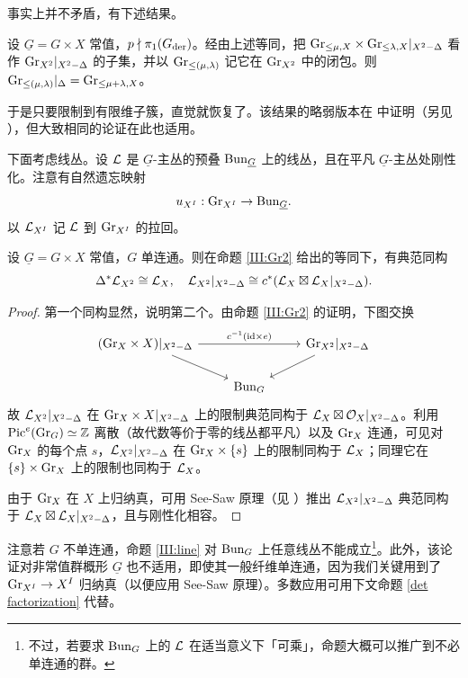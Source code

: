 事实上并不矛盾，有下述结果。

\begin{prop}\label{III:closure}
设 $\underline G=G\times X$ 常值，$p\nmid \pi_1(G_{\operatorname{der}})$。经由上述等同，把 ${\operatorname{Gr}}_{\leq \mu,X}\times {\operatorname{Gr}}_{\leq {\lambda},X}|_{X^2-\Delta}$ 看作 ${\operatorname{Gr}}_{X^2}|_{X^2-\Delta}$ 的子集，并以 ${\operatorname{Gr}}_{\leq (\mu,{\lambda})}$ 记它在 ${\operatorname{Gr}}_{X^2}$ 中的闭包。则 ${\operatorname{Gr}}_{\leq (\mu,{\lambda})}|_{\Delta}= {\operatorname{Gr}}_{\leq \mu+{\lambda},X}$。
\end{prop}

于是只要限制到有限维子簇，直觉就恢复了。该结果的略弱版本在 \cite{Z07} 中证明（另见 \cite{Z10}），但大致相同的论证在此也适用。

下面考虑线丛。设 ${\mathcal L}$ 是 $\underline G$-主丛的预叠 ${\operatorname{Bun}}_{\underline G}$ 上的线丛，且在平凡 $\underline G$-主丛处刚性化。注意有自然遗忘映射
\begin{equation}\label{III:I-un}
u_{X^I}: {\operatorname{Gr}}_{X^I}\to {\operatorname{Bun}}_{\underline G}.
\end{equation}
以 ${\mathcal L}_{X^I}$ 记 ${\mathcal L}$ 到 ${\operatorname{Gr}}_{X^I}$ 的拉回。

\begin{prop}\label{III:line}
设 $\underline G=G\times X$ 常值，$G$ 单连通。则在命题 \ref{III:Gr2} 给出的等同下，有典范同构
\[\Delta^*{\mathcal L}_{X^2}\cong {\mathcal L}_{X}, \quad {\mathcal L}_{X^2}|_{X^2-\Delta}\cong c^*({\mathcal L}_X\boxtimes{\mathcal L}_X|_{X^2-\Delta}).\]
\end{prop}

\begin{proof}
第一个同构显然，说明第二个。由命题 \ref{III:Gr2} 的证明，下图交换
\[\begin{tikzcd}
(\Gr_X\times X)|_{X^2-\Delta}\arrow[rr, "c^{-1}(\id\times e)"]\arrow[dr] & & \Gr_{X^2}|_{X^2-\Delta}\arrow[dl] \\
& \Bun_G &
\end{tikzcd}\]
故 ${\mathcal L}_{X^2}|_{X^2-\Delta}$ 在 ${\operatorname{Gr}}_X\times X|_{X^2-\Delta}$ 上的限制典范同构于 ${\mathcal L}_X\boxtimes{\mathcal O}_{X}|_{X^2-\Delta}$。利用 ${\operatorname{Pic}}^e({\operatorname{Gr}}_G)\simeq {\mathbb Z}$ 离散（故代数等价于零的线丛都平凡）以及 ${\operatorname{Gr}}_X$ 连通，可见对 ${\operatorname{Gr}}_X$ 的每个点 $s$，${\mathcal L}_{X^2}|_{X^2-\Delta}$ 在 ${\operatorname{Gr}}_X\times\{s\}$ 上的限制同构于 ${\mathcal L}_X$；同理它在 $\{s\}\times {\operatorname{Gr}}_X$ 上的限制也同构于 ${\mathcal L}_X$。

由于 ${\operatorname{Gr}}_X$ 在 $X$ 上归纳真，可用 See-Saw 原理（见 \cite[\S 5]{Mum}）推出 ${\mathcal L}_{X^2}|_{X^2-\Delta}$ 典范同构于 ${\mathcal L}_X\boxtimes{\mathcal L}_X|_{X^2-\Delta}$，且与刚性化相容。
\end{proof}

注意若 $G$ 不单连通，命题 \ref{III:line} 对 ${\operatorname{Bun}}_G$ 上任意线丛不能成立\footnote{不过，若要求 ${\operatorname{Bun}}_G$ 上的 ${\mathcal L}$ 在适当意义下「可乘」，命题大概可以推广到不必单连通的群。}。此外，该论证对非常值群概形 $\underline G$ 也不适用，即使其一般纤维单连通，因为我们关键用到了 ${\operatorname{Gr}}_{X^I}\to X^I$ 归纳真（以便应用 See-Saw 原理）。多数应用可用下文命题 \ref{det factorization} 代替。

